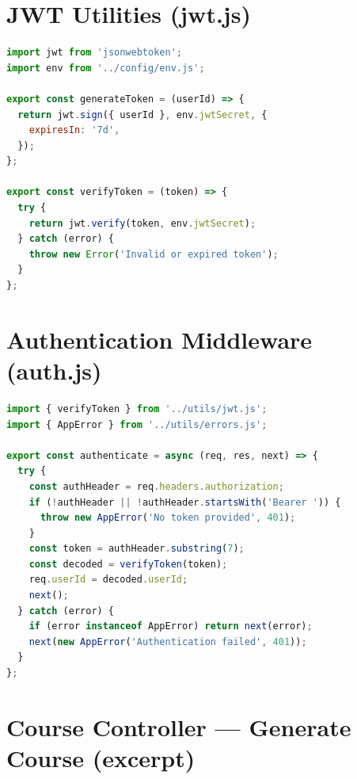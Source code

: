 \documentclass[12pt,a4paper]{report}
\begin{document}
\section{JWT Utilities (jwt.js)}

\begin{lstlisting}[language=JavaScript,caption={jwt.js -- Token Generation and Verification},label={lst:jwt-utils}]
import jwt from 'jsonwebtoken';
import env from '../config/env.js';

export const generateToken = (userId) => {
  return jwt.sign({ userId }, env.jwtSecret, {
    expiresIn: '7d',
  });
};

export const verifyToken = (token) => {
  try {
    return jwt.verify(token, env.jwtSecret);
  } catch (error) {
    throw new Error('Invalid or expired token');
  }
};
\end{lstlisting}

\section{Authentication Middleware (auth.js)}

\begin{lstlisting}[language=JavaScript,caption={auth.js -- JWT Authentication Middleware},label={lst:auth-middleware}]
import { verifyToken } from '../utils/jwt.js';
import { AppError } from '../utils/errors.js';

export const authenticate = async (req, res, next) => {
  try {
    const authHeader = req.headers.authorization;
    if (!authHeader || !authHeader.startsWith('Bearer ')) {
      throw new AppError('No token provided', 401);
    }
    const token = authHeader.substring(7);
    const decoded = verifyToken(token);
    req.userId = decoded.userId;
    next();
  } catch (error) {
    if (error instanceof AppError) return next(error);
    next(new AppError('Authentication failed', 401));
  }
};
\end{lstlisting}

\section{Course Controller — Generate Course (excerpt)}
\end{document}
